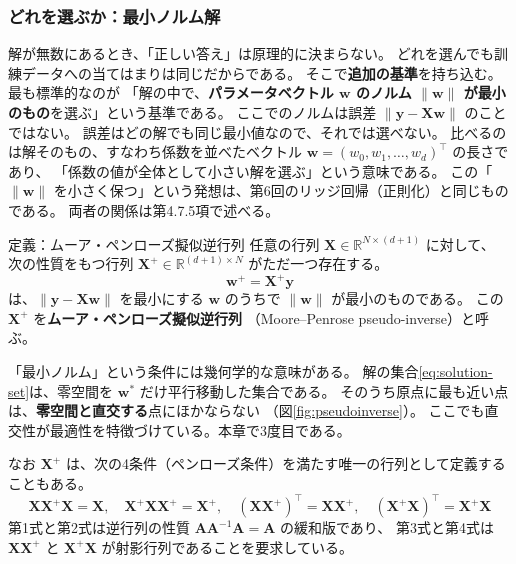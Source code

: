\subsubsection{どれを選ぶか：最小ノルム解}

解が無数にあるとき、「正しい答え」は原理的に決まらない。
どれを選んでも訓練データへの当てはまりは同じだからである。
そこで\textbf{追加の基準}を持ち込む。最も標準的なのが
「解の中で、\textbf{パラメータベクトル $\bm{w}$ のノルム $\|\bm{w}\|$ が最小のもの}を選ぶ」という基準である。
ここでのノルムは誤差 $\|\bm{y} - \bm{X}\bm{w}\|$ のことではない。
誤差はどの解でも同じ最小値なので、それでは選べない。
比べるのは解そのもの、すなわち係数を並べたベクトル $\bm{w} = (w_0, w_1, \ldots, w_d)^\top$ の長さであり、
「係数の値が全体として小さい解を選ぶ」という意味である。
この「$\|\bm{w}\|$ を小さく保つ」という発想は、第6回のリッジ回帰（正則化）と同じものである。
両者の関係は第4.7.5項で述べる。

\begin{itembox}[l]{定義：ムーア・ペンローズ擬似逆行列}
任意の行列 $\bm{X} \in \mathbb{R}^{N \times (d+1)}$ に対して、
次の性質をもつ行列 $\bm{X}^{+} \in \mathbb{R}^{(d+1) \times N}$ がただ一つ存在する。
\begin{equation}
  \bm{w}^{+} = \bm{X}^{+}\bm{y}
  \label{eq:pinv-def}
\end{equation}
は、$\|\bm{y} - \bm{X}\bm{w}\|$ を最小にする $\bm{w}$ のうちで
$\|\bm{w}\|$ が最小のものである。
この $\bm{X}^{+}$ を\textbf{ムーア・ペンローズ擬似逆行列}
（Moore--Penrose pseudo-inverse）と呼ぶ。
\end{itembox}

「最小ノルム」という条件には幾何学的な意味がある。
解の集合\eqref{eq:solution-set}は、零空間を $\bm{w}^*$ だけ平行移動した集合である。
そのうち原点に最も近い点は、\textbf{零空間と直交する}点にほかならない
（図\ref{fig:pseudoinverse}）。
ここでも直交性が最適性を特徴づけている。本章で3度目である。

なお $\bm{X}^{+}$ は、次の4条件（ペンローズ条件）を満たす唯一の行列として定義することもある。
\begin{equation*}
  \bm{X}\bm{X}^{+}\bm{X} = \bm{X}, \quad
  \bm{X}^{+}\bm{X}\bm{X}^{+} = \bm{X}^{+}, \quad
  (\bm{X}\bm{X}^{+})^\top = \bm{X}\bm{X}^{+}, \quad
  (\bm{X}^{+}\bm{X})^\top = \bm{X}^{+}\bm{X}
\end{equation*}
第1式と第2式は逆行列の性質 $\bm{A}\bm{A}^{-1}\bm{A} = \bm{A}$ の緩和版であり、
第3式と第4式は $\bm{X}\bm{X}^{+}$ と $\bm{X}^{+}\bm{X}$ が射影行列であることを要求している。

